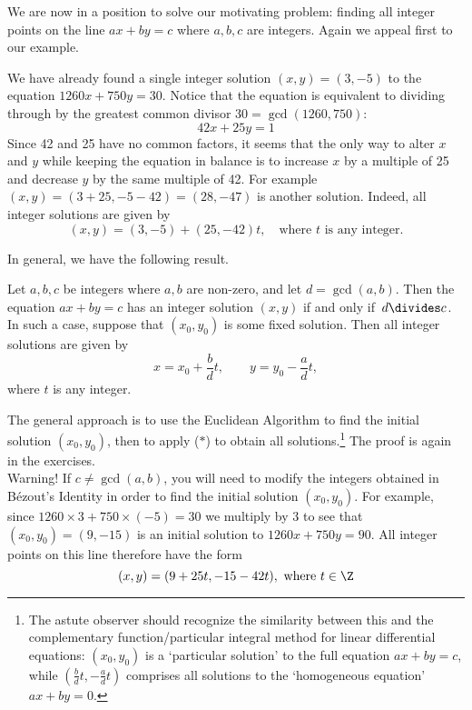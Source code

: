 We are now in a position to solve our motivating problem: finding all integer points on the line $ax+by=c$ where $a,b,c$ are integers. Again we appeal first to our example.

\begin{example}
We have already found a single integer solution $(x,y)=(3,-5)$ to the equation $1260x+750y=30$. Notice that the equation is equivalent to dividing through by the greatest common divisor $30=\gcd(1260,750)$:
\[42x+25y=1\]
Since 42 and 25 have no common factors, it seems that the only way to alter $x$ and $y$ while keeping the equation in balance is to increase $x$ by a multiple of 25 and decrease $y$ by the same multiple of 42. For example $(x,y)=(3+25,-5-42)=(28,-47)$ is another solution. Indeed, all integer solutions are given by
\[(x,y)=(3,-5)+(25,-42)t,\quad\text{where $t$ is any integer.}\]
\end{example}

In general, we have the following result.

\begin{thm}\label{thm:diophanine}
Let $a,b,c$ be integers where $a,b$ are non-zero, and let $d=\gcd(a,b)$. Then the equation $ax+by=c$ has an integer solution $(x,y)$ if and only if $\,d\divides c$.\\
In such a case, suppose that $(x_0,y_0)$ is some fixed solution. Then all integer solutions are given by
\[x=x_0+\frac bdt,\qquad y=y_0-\frac adt,\tag*{($\ast$)}\]
where $t$ is any integer.
\end{thm}

\noindent The general approach is to use the Euclidean Algorithm to find the initial solution $(x_0,y_0)$, then to apply ($\ast$) to obtain all solutions.\footnote{The astute observer should recognize the similarity between this and the complementary function/particular integral method for linear differential equations: $(x_0,y_0)$ is a `particular solution' to the full equation $ax+by=c$, while $(\frac bdt,-\frac adt)$ comprises all solutions to the `homogeneous equation' $ax+by=0$.} The proof is again in the exercises.\\

\noindent Warning! If $c\neq\gcd(a,b)$, you will need to modify the integers obtained in Bézout's Identity in order to find the initial solution $(x_0,y_0)$. For example, since $1260\times 3+750\times(-5)=30$ we multiply by 3 to see that $(x_0,y_0)=(9,-15)$ is an initial solution to $1260x+750y=90$. All integer points on this line therefore have the form
\[(x,y)=(9+25t,-15-42t), \text{ where }t\in\Z\]

